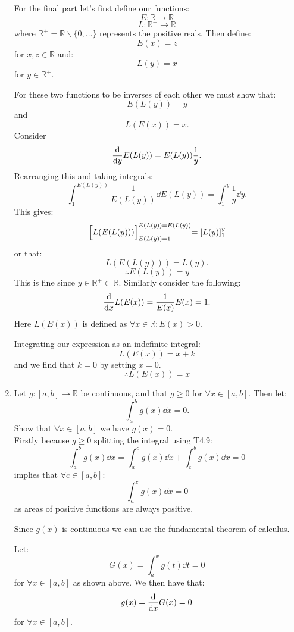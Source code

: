 \begin{enumerate}
    \newpage

    For the final part let's first define our functions:
    $$E:\mathbb{R}\rightarrow\mathbb{R}$$
    $$L:\mathbb{R^+}\rightarrow\mathbb{R}$$
    where $\mathbb{R^+}=\mathbb{R}\backslash\{0,\dots\}$ represents the positive reals. Then define:
    $$E(x)=z$$
    for $x,z\in\mathbb{R}$ and:
    $$L(y)=x$$
    for $y\in\mathbb{R^+}$.
    
    For these two functions to be inverses
    of each other we must show that:
    $$E(L(y))=y$$
    and
    $$L(E(x))=x.$$
    Consider
    $$\dv{y}E(L(y))=E(L(y))\frac{1}{y}.$$
    Rearranging this and taking integrals:
    $$\int_{1}^{E(L(y))}\frac{1}{E(L(y))}\dd E(L(y))
    =\int_{1}^{y}\frac{1}{y}\dd y.$$
    This gives:
    $$\Bigl[L(E(L(y)))\Bigl]_{E(L(y))=1}^{E(L(y))=E(L(y))}
    =\left[L(y)\right]_{1}^{y}$$
    or that:
    $$L(E(L(y)))=L(y).$$
    $$\therefore E(L(y))=y$$
    This is fine since $y\in\mathbb{R^+}\subset\mathbb{R}$.
    Similarly consider the following:
    $$\dv{x}L(E(x))=\frac{1}{E(x)}E(x)=1.$$
    Here $L(E(x))$ is defined as $\forall x\in\mathbb{R};
    E(x)>0$.
    
    Integrating our expression as an indefinite integral:
    $$L(E(x))=x+k$$
    and we find that $k=0$ by setting $x=0$.
    $$\therefore L(E(x))=x$$

    \newpage

    \item Let $g:[a,b]\rightarrow\mathbb{R}$ be continuous, and that
    $g\geq0$ for $\forall x\in[a,b]$. Then let:
    $$\int_{a}^{b}g(x)\dd x=0.$$
    Show that $\forall x\in[a,b]$ we have $g(x)=0$. \\

    Firstly because $g\geq0$ splitting the integral using T4.9:
    $$\int_{a}^{b}g(x)\dd x
    =\int_{a}^{c}g(x)\dd x+\int_{c}^{b}g(x)\dd x=0$$
    implies that $\forall c\in[a,b]$:
    $$\int_{a}^{c}g(x)\dd x=0$$
    as areas of positive functions are always positive.

    Since $g(x)$ is continuous we can use the fundamental
    theorem of calculus.
    
    Let:
    $$G(x)=\int_{a}^{x}g(t)\dd t=0$$
    for $\forall x\in[a,b]$ as shown above.
    We then have that:
    $$g(x)=\dv{x}G(x)=0$$
    for $\forall x\in[a,b]$.
\end{enumerate}